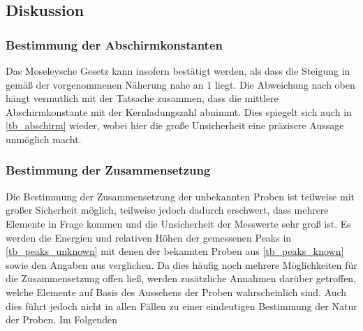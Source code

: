 \documentclass[
	a4paper,
	12pt,
	pagesize,
	ngerman
]{scrartcl}
\begin{document}
	\subsection{Diskussion}
	\subsubsection{Bestimmung der Abschirmkonstanten}
	Das Moseleysche Gesetz kann insofern bestätigt werden, als dass die Steigung in  gemäß der vorgenommenen Näherung nahe an \num{1} liegt.
	Die Abweichung nach oben hängt vermutlich mit der Tatsache zusammen, dass die mittlere Abschirmkonstante mit der Kernladungszahl abnimmt.
	Dies spiegelt sich auch in \cref{tb_abschirm} wieder, wobei hier die große Unsicherheit eine präzisere Aussage unmöglich macht.
	
	\subsubsection{Bestimmung der Zusammensetzung}
	Die Bestimmung der Zusammensetzung der unbekannten Proben ist teilweise mit großer Sicherheit möglich, teilweise jedoch dadurch erschwert, dass mehrere Elemente in Frage kommen und die Unsicherheit der Messwerte sehr groß ist.
	Es werden die Energien und relativen Höhen der gemessenen Peaks in \cref{tb_peaks_unknown} mit denen der bekannten Proben aus \cref{tb_peaks_known} sowie den Angaben aus \cite{XRAYDB} verglichen.
	Da dies häufig noch mehrere Möglichkeiten für die Zusammensetzung offen ließ, werden zusätzliche Annahmen darüber getroffen, welche Elemente auf Basis des Aussehens der Proben wahrscheinlich sind.
	Auch dies führt jedoch nicht in allen Fällen zu einer eindeutigen Bestimmung der Natur der Proben.
	Im Folgenden %
	
\end{document}
